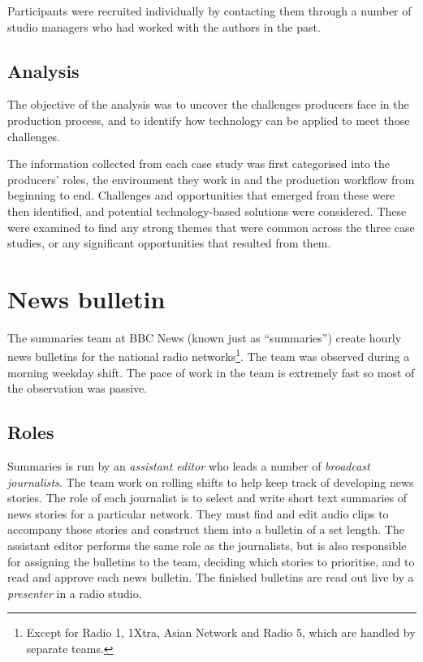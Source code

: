 Participants were recruited individually by contacting them through a number of
studio managers who had worked with the authors in the past. 

\subsection{Analysis}
The objective of the analysis was to uncover the challenges producers face in
the production process, and to identify how technology can be applied to meet
those challenges.

The information collected from each case study was first categorised into the
producers' roles, the environment they work in and the production workflow from
beginning to end. Challenges and opportunities that emerged from these were
then identified, and potential technology-based solutions were considered.
These were examined to find any strong themes that were common across the
three case studies, or any significant opportunities that resulted from them.

\section{News bulletin}\label{sec:news}
The summaries team at BBC News (known just as ``summaries'') create hourly news
bulletins for the national radio networks\footnote{Except for Radio 1, 1Xtra,
  Asian Network and Radio 5, which are handled by separate teams.}. The team
was observed during a morning weekday shift. The pace of work in the team is
extremely fast so most of the observation was passive.

\subsection{Roles}\label{sec:news-roles}
Summaries is run by an \textit{assistant editor} who leads a number of
\textit{broadcast journalists}. The team work on rolling shifts to help keep
track of developing news stories. The role of each journalist is to select and
write short text summaries of news stories for a particular network. They must
find and edit audio clips to accompany those stories and construct them into a
bulletin of a set length.  The assistant editor performs the same role as the
journalists, but is also responsible for assigning the bulletins to the team,
deciding which stories to prioritise, and to read and approve each news
bulletin. The finished bulletins are read out live by a \textit{presenter} in a
radio studio.

